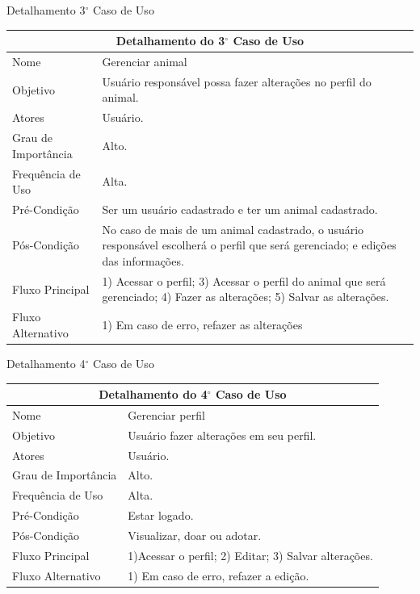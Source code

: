 \begin{apendicesenv}
\begin{quadro}[!htbp]
\caption[Detalhamento 3$^\circ$ Caso de Uso]{Detalhamento 3$^\circ$ Caso de Uso}
\begin{tabular}{|p{4cm}|p{9.95cm}|}
\hline
\multicolumn{2}{|c|}{Detalhamento do 3$^\circ$ Caso de Uso}\\ 
\hline
Nome & Gerenciar animal \\
\hline
Objetivo & Usuário responsável possa fazer alterações no perfil do animal. \\
\hline
Atores & Usuário. \\
\hline
Grau de Importância & Alto. \\
\hline
Frequência de Uso & Alta. \\
\hline
Pré-Condição & Ser um usuário cadastrado e ter um animal cadastrado. \\
\hline
Pós-Condição & No caso de mais de um animal cadastrado, o usuário responsável escolherá o perfil que será gerenciado; e edições das informações. \\
\hline
Fluxo Principal & 1) Acessar o perfil; 3) Acessar o perfil do animal que será gerenciado; 4) Fazer as alterações; 5) Salvar as alterações. \\
\hline
Fluxo Alternativo & 1) Em caso de erro, refazer as alterações \\
\hline
\end{tabular}
\end{quadro}

\begin{quadro}[!htbp]
\caption[Detalhamento 4$^\circ$ Caso de Uso]{Detalhamento 4$^\circ$ Caso de Uso}
\begin{tabular}{|p{4cm}|p{9.95cm}|}
\hline
\multicolumn{2}{|c|}{Detalhamento do 4$^\circ$ Caso de Uso}\\ 
\hline
Nome & Gerenciar perfil \\
\hline
Objetivo & Usuário fazer alterações em seu perfil. \\
\hline
Atores & Usuário. \\
\hline
Grau de Importância & Alto. \\
\hline
Frequência de Uso & Alta. \\
\hline
Pré-Condição & Estar logado. \\
\hline
Pós-Condição & Visualizar, doar ou adotar.  \\
\hline
Fluxo Principal & 1)Acessar o perfil; 2) Editar; 3) Salvar alterações. \\
\hline
Fluxo Alternativo & 1) Em caso de erro, refazer a edição. \\
\hline
\end{tabular}
\end{quadro}


\end{apendicesenv}
